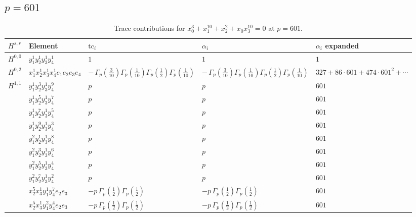 \documentclass[11pt]{article}
\begin{document}
\subsection*{$p = 601$}

\begin{table}[ht]
\centering
\caption{Trace contributions for $x_0^{3} + x_1^{10} + x_2^{2} + x_0 x_3^{10} = 0$ at $p=601$.}\label{tab:deformed-72}
\renewcommand{\arraystretch}{1.1}
{\scriptsize
\begin{tabular}{@{}lllll@{}}
\toprule
$H^{s,r}$ & Element & $\mathrm{tc}_i$ & $\alpha_i$ & $\alpha_i$ expanded \\
\midrule
$H^{0,0}$ & $y_{1}^{1} y_{2}^{1} y_{3}^{1} y_{4}^{1}$ & $1$ & $1$ & $1$ \\
\midrule
$H^{0,2}$ & $x_{1}^{1} x_{2}^{1} x_{3}^{1} x_{4}^{1}  e_{1} e_{2} e_{3} e_{4}$ & $- \, \Gamma_p \left( \frac{3}{10} \right) \Gamma_p \left( \frac{1}{10} \right) \Gamma_p \left( \frac{1}{2} \right) \Gamma_p \left( \frac{1}{10} \right)$ & $- \, \Gamma_p \left( \frac{3}{10} \right) \Gamma_p \left( \frac{1}{10} \right) \Gamma_p \left( \frac{1}{2} \right) \Gamma_p \left( \frac{1}{10} \right)$ & $327{+}86{\cdot}601{+}474{\cdot}601^{2}{+}\cdots$ \\
\midrule
$H^{1,1}$ & $y_{1}^{1} y_{2}^{3} y_{3}^{1} y_{4}^{9}$ & $p \,$ & $p \,$ & $601$ \\
 & $y_{1}^{1} y_{2}^{5} y_{3}^{1} y_{4}^{7}$ & $p \,$ & $p \,$ & $601$ \\
 & $y_{1}^{1} y_{2}^{7} y_{3}^{1} y_{4}^{5}$ & $p \,$ & $p \,$ & $601$ \\
 & $y_{1}^{1} y_{2}^{9} y_{3}^{1} y_{4}^{3}$ & $p \,$ & $p \,$ & $601$ \\
 & $y_{1}^{2} y_{2}^{1} y_{3}^{1} y_{4}^{8}$ & $p \,$ & $p \,$ & $601$ \\
 & $y_{1}^{2} y_{2}^{3} y_{3}^{1} y_{4}^{6}$ & $p \,$ & $p \,$ & $601$ \\
 & $y_{1}^{2} y_{2}^{5} y_{3}^{1} y_{4}^{4}$ & $p \,$ & $p \,$ & $601$ \\
 & $y_{1}^{2} y_{2}^{7} y_{3}^{1} y_{4}^{2}$ & $p \,$ & $p \,$ & $601$ \\
 & $x_{2}^{5} x_{3}^{1} y_{1}^{1} y_{4}^{7} e_{2} e_{3}$ & $- p \, \Gamma_p \left( \frac{1}{2} \right) \Gamma_p \left( \frac{1}{2} \right)$ & $- p \, \Gamma_p \left( \frac{1}{2} \right) \Gamma_p \left( \frac{1}{2} \right)$ & $601$ \\
 & $x_{2}^{5} x_{3}^{1} y_{1}^{2} y_{4}^{4} e_{2} e_{3}$ & $- p \, \Gamma_p \left( \frac{1}{2} \right) \Gamma_p \left( \frac{1}{2} \right)$ & $- p \, \Gamma_p \left( \frac{1}{2} \right) \Gamma_p \left( \frac{1}{2} \right)$ & $601$ \\

\end{tabular}}
\end{table}
\end{document}
